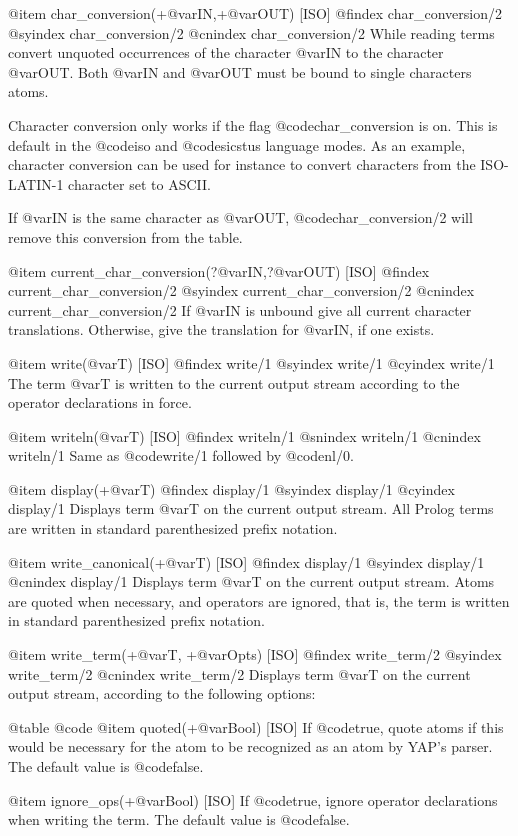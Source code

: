 {{{{{@item char_conversion(+@var{IN},+@var{OUT}) [ISO]
@findex char_conversion/2
@syindex char_conversion/2
@cnindex char_conversion/2
While reading terms convert unquoted occurrences of the character
@var{IN} to the character @var{OUT}. Both @var{IN} and @var{OUT} must be
bound to single characters atoms.

Character conversion only works if the flag @code{char_conversion} is
on. This is default in the @code{iso} and @code{sicstus} language
modes. As an example, character conversion can be used for instance to
convert characters from the ISO-LATIN-1 character set to ASCII.

If @var{IN} is the same character as @var{OUT}, @code{char_conversion/2}
will remove this conversion from the table.

@item current_char_conversion(?@var{IN},?@var{OUT}) [ISO]
@findex current_char_conversion/2
@syindex current_char_conversion/2
@cnindex current_char_conversion/2
If @var{IN} is unbound give all current character
translations. Otherwise, give the translation for @var{IN}, if one
exists.

@item write(@var{T}) [ISO]
@findex write/1
@syindex write/1
@cyindex write/1
The term @var{T} is written to the current output stream according to
the operator declarations in force.

@item writeln(@var{T}) [ISO]
@findex writeln/1
@snindex writeln/1
@cnindex writeln/1
Same as @code{write/1} followed by @code{nl/0}.

@item display(+@var{T})
@findex display/1
@syindex display/1
@cyindex display/1
Displays term @var{T} on the current output stream. All Prolog terms are
written in standard parenthesized prefix notation.

@item write_canonical(+@var{T}) [ISO]
@findex display/1
@syindex display/1
@cnindex display/1
Displays term @var{T} on the current output stream. Atoms are quoted
when necessary, and operators are ignored, that is, the term is written
in standard parenthesized prefix notation.

@item write_term(+@var{T}, +@var{Opts}) [ISO]
@findex write_term/2
@syindex write_term/2
@cnindex write_term/2
Displays term @var{T} on the current output stream, according to the
following options:

@table @code
@item quoted(+@var{Bool}) [ISO]
If @code{true}, quote atoms if this would be necessary for the atom to
be recognized as an atom by YAP's parser. The default value is
@code{false}.

@item ignore_ops(+@var{Bool}) [ISO]
If @code{true}, ignore operator declarations when writing the term. The
default value is @code{false}.

}}}}}
